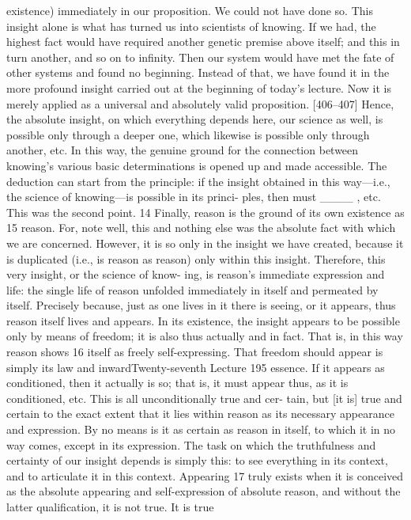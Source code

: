 existence) immediately in our proposition. We could not have done so. This
insight alone is what has turned us into scientists of knowing. If we had, the
highest fact would have required another genetic premise above itself; and this
in turn another, and so on to infinity. Then our system would have met the
fate of other systems and found no beginning. Instead of that, we have found
it in the more profound insight carried out at the beginning of today’s lecture.
Now it is merely applied as a universal and absolutely valid proposition.
[406–407] Hence, the absolute insight, on which everything depends here,
our science as well, is possible only through a deeper one, which likewise is
possible only through another, etc. In this way, the genuine ground for the
connection between knowing’s various basic determinations is opened up and
made accessible. The deduction can start from the principle: if the insight
obtained in this way—i.e., the science of knowing—is possible in its princi-
ples, then must ____ , etc. This was the second point. 14 Finally, reason is the
ground of its own existence as 15 reason. For, note well, this and nothing else
was the absolute fact with which we are concerned. However, it is so only in
the insight we have created, because it is duplicated (i.e., is reason as reason)
only within this insight. Therefore, this very insight, or the science of know-
ing, is reason’s immediate expression and life: the single life of reason unfolded
immediately in itself and permeated by itself. Precisely because, just as one
lives in it there is seeing, or it appears, thus reason itself lives and appears. In
its existence, the insight appears to be possible only by means of freedom; it is
also thus actually and in fact. That is, in this way reason shows 16 itself as freely
self-expressing. That freedom should appear is simply its law and inwardTwenty-seventh Lecture
195
essence. If it appears as conditioned, then it actually is so; that is, it must
appear thus, as it is conditioned, etc. This is all unconditionally true and cer-
tain, but [it is] true and certain to the exact extent that it lies within reason as
its necessary appearance and expression. By no means is it as certain as reason
in itself, to which it in no way comes, except in its expression. The task on
which the truthfulness and certainty of our insight depends is simply this: to
see everything in its context, and to articulate it in this context. Appearing 17
truly exists when it is conceived as the absolute appearing and self-expression
of absolute reason, and without the latter qualification, it is not true. It is true
